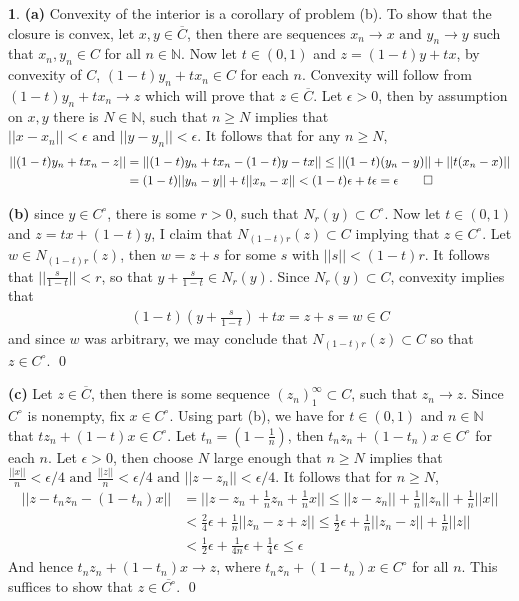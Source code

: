 \documentclass[10.5pt]{article}
\theoremstyle{definition}
\newtheorem{pb}{}
\newcommand{\norm}[1]{\lvert\lvert#1\rvert\rvert}
\newcommand{\tand}{\text{ and }}
\begin{document}
    \begin{pb}
        \textbf{(a)} Convexity of the interior is a corollary of problem (b). To show that the closure is convex, let \(x,y \in \overline{C}\), then there are sequences \(x_n \to x \tand y_n \to y\) such that \(x_n,y_n \in C\) for all \(n \in \mathbb{N}\). Now let \(t \in (0,1)\) and \(z = (1-t)y + tx\), by convexity of \(C\), \((1-t)y_n + tx_n \in C\) for each \(n\). Convexity will follow from \((1-t)y_n + tx_n \to z\) which will prove that \(z \in \overline{C}\). Let \(\epsilon > 0\), then by assumption on \(x,y\) there is \(N \in \mathbb{N}\), such that \(n \geq N\) implies that \(\norm{x - x_n} < \epsilon \tand \norm{y - y_n} < \epsilon\). It follows that for any \(n \geq N\),
        \begin{align*}
            \norm{(1-t)y_n + tx_n - z} &= \norm{(1-t)y_n + tx_n - (1-t)y - tx} \leq \norm{(1-t)(y_n-y)} + \norm{t(x_n - x)}\\ 
            &= (1-t)\norm{y_n - y} + t\norm{x_n - x} < (1-t)\epsilon + t \epsilon = \epsilon \qed
        \end{align*}

        \textbf{(b)} since \(y \in C^\circ\), there is some \(r > 0\), such that \(N_r(y) \subset C^\circ\). Now let \(t \in (0,1)\) and \(z = tx + (1-t)y\), I claim that \(N_{(1-t)r}(z) \subset C\) implying that \(z \in C^\circ\). Let \(w \in N_{(1-t)r}(z)\), then \(w = z + s\) for some \(s\) with \(\norm{s} < (1-t)r\). It follows that \(\norm{\frac{s}{1-t}} < r\), so that \(y + \frac{s}{1-t} \in N_r(y)\). Since \(N_r(y) \subset C\), convexity implies that
        \begin{align*}
            (1-t)(y + \frac{s}{1-t}) + tx = z + s = w \in C
        \end{align*}
        and since \(w\) was arbitrary, we may conclude that \(N_{(1-t)r}(z) \subset C\) so that \(z \in C^\circ\). \qed

        \textbf{(c)} Let \(z \in \overline{C}\), then there is some sequence \((z_n)_1^\infty \subset C\), such that \(z_n \to z\). Since \(C^\circ\) is nonempty, fix \(x \in C^\circ\). Using part (b), we have for \(t \in (0,1)\) and \(n \in \mathbb{N}\) that \(tz_n + (1-t)x \in C^\circ\). Let \(t_n = (1-\frac{1}{n})\), then \(t_nz_n + (1-t_n)x \in C^\circ\) for each \(n\). Let \(\epsilon > 0\), then choose \(N\) large enough that \(n \geq N\) implies that \(\frac{\norm{x}}{n} < \epsilon/4 \tand \frac{\norm{z}}{n} < \epsilon/4 \tand \norm{z - z_n} < \epsilon/4\). It follows that for \(n \geq N\),
        \begin{align*}
            \norm{z - t_nz_n - (1-t_n)x} &= \norm{z - z_n + \frac{1}{n}z_n + \frac{1}{n}x} \leq \norm{z - z_n} + \frac{1}{n}\norm{z_n} + \frac{1}{n}\norm{x} \\
            &< \frac{2}{4}\epsilon + \frac{1}{n}\norm{z_n - z + z} \leq \frac{1}{2}\epsilon + \frac{1}{n}\norm{z_n - z} + \frac{1}{n}\norm{z} \\
            &< \frac12 \epsilon + \frac{1}{4n}\epsilon + \frac14 \epsilon \leq \epsilon
        \end{align*}
        And hence \(t_nz_n + (1-t_n)x \to z\), where \(t_nz_n + (1-t_n)x \in C^\circ\) for all \(n\). This suffices to show that \(z \in \overline{C^\circ}\). \qed
    \end{pb}
\end{document}
